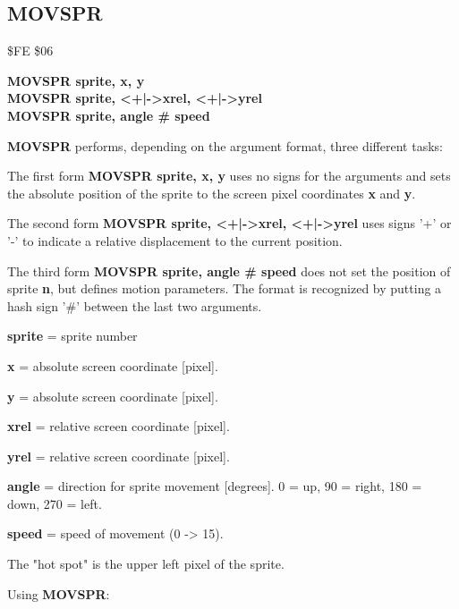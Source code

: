 \subsection{MOVSPR}
\begin{description}[leftmargin=3cm,style=nextline]
\item [Token:] \$FE \$06
\item [Format:] {\bf MOVSPR sprite, x, y} \\
                {\bf MOVSPR sprite, <+|->xrel, <+|->yrel} \\
                {\bf MOVSPR sprite, angle \# speed}
\item [Usage:]  {\bf MOVSPR} performs, depending on the argument
                format, three different tasks:

                The first form {\bf MOVSPR sprite, x, y} uses no
                signs for the arguments and sets the absolute
                position of the sprite to the screen pixel
                coordinates {\bf x} and {\bf y}.

                The second form {\bf MOVSPR sprite, <+|->xrel, <+|->yrel}
                uses signs '+' or '-' to indicate a relative
                displacement to the current position.

                The third form {\bf MOVSPR sprite, angle \# speed} does not
                set the position of sprite {\bf n}, but defines
                motion parameters. The format is recognized by putting
                a hash sign '\#' between the last two arguments.

                {\bf sprite} = sprite number

                {\bf x} = absolute screen coordinate [pixel].

                {\bf y} = absolute screen coordinate [pixel].

                {\bf xrel} = relative screen coordinate [pixel].

                {\bf yrel} = relative screen coordinate [pixel].

                {\bf angle} = direction for sprite movement [degrees].
                0 = up, 90 = right, 180 = down, 270 = left.

                {\bf speed} = speed of movement (0 -> 15).

\item [Remarks:] The "hot spot" is the upper left pixel of the sprite.

\item [Example:] Using {\bf MOVSPR}:
\end{description}

